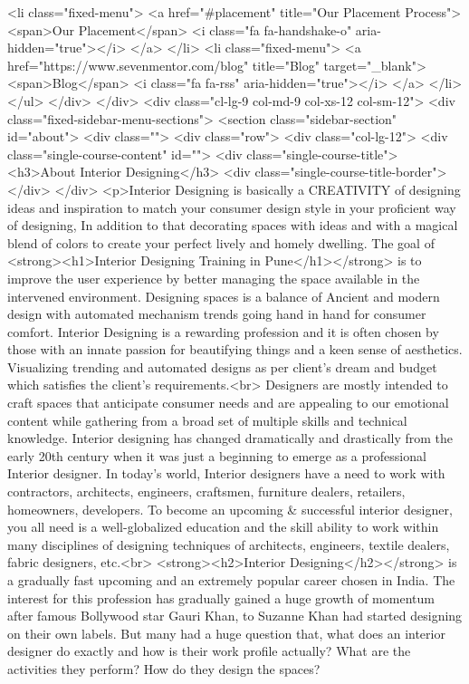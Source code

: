 {<li class="fixed-menu">
<a href="#placement" title="Our Placement Process">
<span>Our Placement</span>
<i class="fa fa-handshake-o" aria-hidden="true"></i>
</a>
</li>
<li class="fixed-menu">
<a href="https://www.sevenmentor.com/blog" title="Blog" target="_blank">
<span>Blog</span>
<i class="fa fa-rss" aria-hidden="true"></i>
</a>
</li>
</ul>
</div>
</div>
<div class="cl-lg-9 col-md-9 col-xs-12 col-sm-12">
<div class="fixed-sidebar-menu-sections">
<section class="sidebar-section" id="about">
<div class="">
<div class="row">
<div class="col-lg-12">
<div class="single-course-content" id="">
<div class="single-course-title">
<h3>About Interior Designing</h3>
<div class="single-course-title-border"></div>
</div>
<p>Interior Designing is basically a CREATIVITY of designing ideas and inspiration to match your consumer design style in your proficient way of designing, In addition to that decorating spaces with ideas and with a magical blend of colors to create your perfect lively and homely dwelling. The goal of <strong><h1>Interior Designing Training in Pune</h1></strong> is to improve the user experience by better managing the space available in the intervened environment.
Designing spaces is a balance of Ancient and modern design with automated mechanism trends going hand in hand for consumer comfort. Interior Designing is a rewarding profession and it is often chosen by those with an innate passion for beautifying things and a keen sense of aesthetics. Visualizing trending and automated designs as per client’s dream and budget which satisfies the client’s requirements.<br>
Designers are mostly intended to craft spaces that anticipate consumer needs and are appealing to our emotional content while gathering from a broad set of multiple skills and technical knowledge. Interior designing has changed dramatically and drastically from the early 20th century when it was just a beginning to emerge as a professional Interior designer.
In today’s world, Interior designers have a need to work with contractors, architects, engineers, craftsmen, furniture dealers, retailers, homeowners, developers. To become an upcoming & successful interior designer, you all need is a well-globalized education and the skill ability to work within many disciplines of designing techniques of architects, engineers, textile dealers, fabric designers, etc.<br>
<strong><h2>Interior Designing</h2></strong> is a gradually fast upcoming and an extremely popular career chosen in India. The interest for this profession has gradually gained a huge growth of momentum after famous Bollywood star Gauri Khan, to Suzanne Khan had started designing on their own labels. But many had a huge question that, what does an interior designer do exactly and how is their work profile actually? What are the activities they perform? How do they design the spaces?
}
